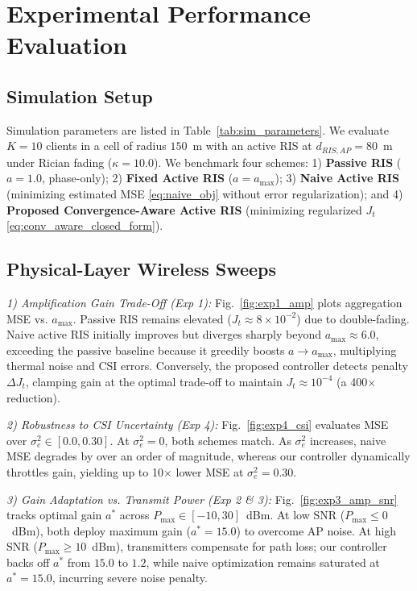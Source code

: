\documentclass[journal,twocolumn]{IEEEtran}
\begin{document}


\section{Experimental Performance Evaluation}

\subsection{Simulation Setup}
Simulation parameters are listed in Table~\ref{tab:sim_parameters}. We evaluate $K=10$ clients in a cell of radius $150$~m with an active RIS at $d_{RIS,AP} = 80$~m under Rician fading ($\kappa = 10.0$). We benchmark four schemes: 1) \textbf{Passive RIS} ($a=1.0$, phase-only); 2) \textbf{Fixed Active RIS} ($a=a_{\max}$); 3) \textbf{Naive Active RIS} (minimizing estimated MSE \eqref{eq:naive_obj} without error regularization); and 4) \textbf{Proposed Convergence-Aware Active RIS} (minimizing regularized $J_t$ \eqref{eq:conv_aware_closed_form}).

\subsection{Physical-Layer Wireless Sweeps}

\textit{1) Amplification Gain Trade-Off (Exp 1):} Fig.~\ref{fig:exp1_amp} plots aggregation MSE vs. $a_{\max}$. Passive RIS remains elevated ($J_t \approx 8 \times 10^{-2}$) due to double-fading. Naive active RIS initially improves but diverges sharply beyond $a_{\max} \approx 6.0$, exceeding the passive baseline because it greedily boosts $a \to a_{\max}$, multiplying thermal noise and CSI errors. Conversely, the proposed controller detects penalty $\Delta J_t$, clamping gain at the optimal trade-off to maintain $J_t \approx 10^{-4}$ (a 400$\times$ reduction).

\textit{2) Robustness to CSI Uncertainty (Exp 4):} Fig.~\ref{fig:exp4_csi} evaluates MSE over $\sigma_e^2 \in [0.0, 0.30]$. At $\sigma_e^2 = 0$, both schemes match. As $\sigma_e^2$ increases, naive MSE degrades by over an order of magnitude, whereas our controller dynamically throttles gain, yielding up to 10$\times$ lower MSE at $\sigma_e^2 = 0.30$.

\textit{3) Gain Adaptation vs. Transmit Power (Exp 2 \& 3):} Fig.~\ref{fig:exp3_amp_snr} tracks optimal gain $a^*$ across $P_{\max} \in [-10, 30]$~dBm. At low SNR ($P_{\max} \le 0$~dBm), both deploy maximum gain ($a^* = 15.0$) to overcome AP noise. At high SNR ($P_{\max} \ge 10$~dBm), transmitters compensate for path loss; our controller backs off $a^*$ from $15.0$ to $1.2$, while naive optimization remains saturated at $a^* = 15.0$, incurring severe noise penalty.
\end{document}
